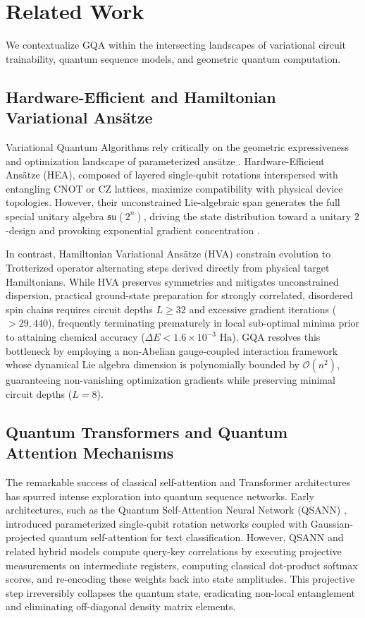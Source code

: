 \documentclass{article}
\begin{document}
\section{Related Work}
\label{sec:related_work}

We contextualize GQA within the intersecting landscapes of variational circuit trainability, quantum sequence models, and geometric quantum computation.

\subsection{Hardware-Efficient and Hamiltonian Variational Ans\"atze}
\label{sec:rel_vqa_bp}

Variational Quantum Algorithms rely critically on the geometric expressiveness and optimization landscape of parameterized ans\"atze \citep{Larocca2024BarrenPlateaus}. Hardware-Efficient Ans\"atze (HEA), composed of layered single-qubit rotations interspersed with entangling CNOT or CZ lattices, maximize compatibility with physical device topologies. However, their unconstrained Lie-algebraic span generates the full special unitary algebra $\mathfrak{su}(2^n)$, driving the state distribution toward a unitary $2$-design and provoking exponential gradient concentration \citep{Larocca2024BarrenPlateaus}.

In contrast, Hamiltonian Variational Ans\"atze (HVA) constrain evolution to Trotterized operator alternating steps derived directly from physical target Hamiltonians. While HVA preserves symmetries and mitigates unconstrained dispersion, practical ground-state preparation for strongly correlated, disordered spin chains requires circuit depths $L \ge 32$ and excessive gradient iterations ($>29{,}440$), frequently terminating prematurely in local sub-optimal minima prior to attaining chemical accuracy ($\Delta E < 1.6 \times 10^{-3}\text{ Ha}$). GQA resolves this bottleneck by employing a non-Abelian gauge-coupled interaction framework whose dynamical Lie algebra dimension is polynomially bounded by $\mathcal{O}(n^2)$, guaranteeing non-vanishing optimization gradients while preserving minimal circuit depths ($L=8$).

\subsection{Quantum Transformers and Quantum Attention Mechanisms}
\label{sec:rel_qtransformer}

The remarkable success of classical self-attention and Transformer architectures has spurred intense exploration into quantum sequence networks. Early architectures, such as the Quantum Self-Attention Neural Network (QSANN) \citep{Li2022QuantumSelfattention}, introduced parameterized single-qubit rotation networks coupled with Gaussian-projected quantum self-attention for text classification. However, QSANN and related hybrid models compute query-key correlations by executing projective measurements on intermediate registers, computing classical dot-product softmax scores, and re-encoding these weights back into state amplitudes. This projective step irreversibly collapses the quantum state, eradicating non-local entanglement and eliminating off-diagonal density matrix elements.
\end{document}
